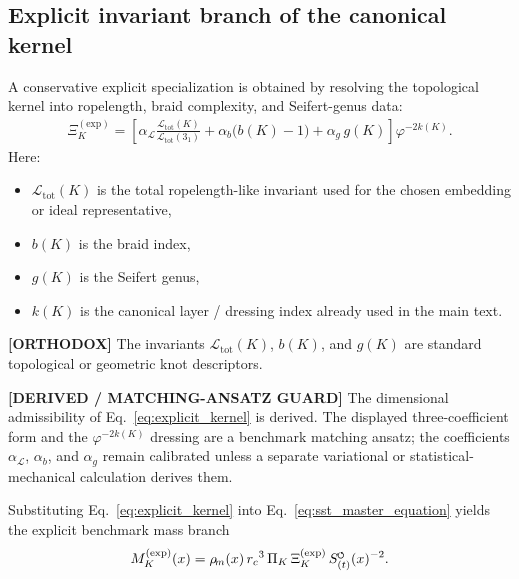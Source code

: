 \documentclass[11pt]{article}
\theoremstyle{definition}
\theoremstyle{plain}
\theoremstyle{remark}
\newcommand{\swirlarrow}{\mathchoice{\mkern-2mu\scriptstyle\boldsymbol{\circlearrowleft}}{\mkern-2mu\scriptstyle\boldsymbol{\circlearrowleft}}{\mkern-2mu\scriptscriptstyle\boldsymbol{\circlearrowleft}}{\mkern-2mu\scriptscriptstyle\boldsymbol{\circlearrowleft}}}
\newcommand{\rhoM}{\rho_{\!m}}
\newcommand{\SwirlClock}{{S_{(t)}^{\swirlarrow}}}
\newcommand{\rc}{{r_c}}
\begin{document}
    \subsection{Explicit invariant branch of the canonical kernel}
        A conservative explicit specialization is obtained by resolving the topological kernel into ropelength, braid complexity, and Seifert-genus data:
        \begin{align}
            \Xi_K^{(\mathrm{exp})}
            =
            \left[
                \alpha_{\mathcal{L}}
                \frac{\mathcal{L}_{\mathrm{tot}}(K)}{\mathcal{L}_{\mathrm{tot}}(3_1)}
                +
                \alpha_b \bigl(b(K)-1\bigr)
            +
                \alpha_g\, g(K)
            \right]
            \varphi^{-2k(K)}.
            \label{eq:explicit_kernel}
        \end{align}
        Here:
        \begin{itemize}
            \item \(\mathcal{L}_{\mathrm{tot}}(K)\) is the total ropelength-like invariant used for the chosen embedding or ideal representative,
            \item \(b(K)\) is the braid index,
            \item \(g(K)\) is the Seifert genus,
            \item \(k(K)\) is the canonical layer / dressing index already used in the main text.
        \end{itemize}
        
        \textbf{[ORTHODOX]} The invariants \(\mathcal{L}_{\mathrm{tot}}(K)\), \(b(K)\), and \(g(K)\) are standard topological or geometric knot descriptors.
        
        \textbf{[DERIVED / MATCHING-ANSATZ GUARD]} The dimensional admissibility of Eq.~\eqref{eq:explicit_kernel} is derived. The displayed three-coefficient form and the $\varphi^{-2k(K)}$ dressing are a benchmark matching ansatz; the coefficients $\alpha_{\mathcal{L}}$, $\alpha_b$, and $\alpha_g$ remain calibrated unless a separate variational or statistical-mechanical calculation derives them.
        
        Substituting Eq.~\eqref{eq:explicit_kernel} into Eq.~\eqref{eq:sst_master_equation} yields the explicit benchmark mass branch
        \begin{align}
            M_K^{(\mathrm{exp})}(x)
            =
            \rhoM(x)\,\rc^3\,\Pi_K\,\Xi_K^{(\mathrm{exp})}\,\SwirlClock(x)^{-2}.
            \label{eq:explicit_mass_branch}
        \end{align}
    
\end{document}
